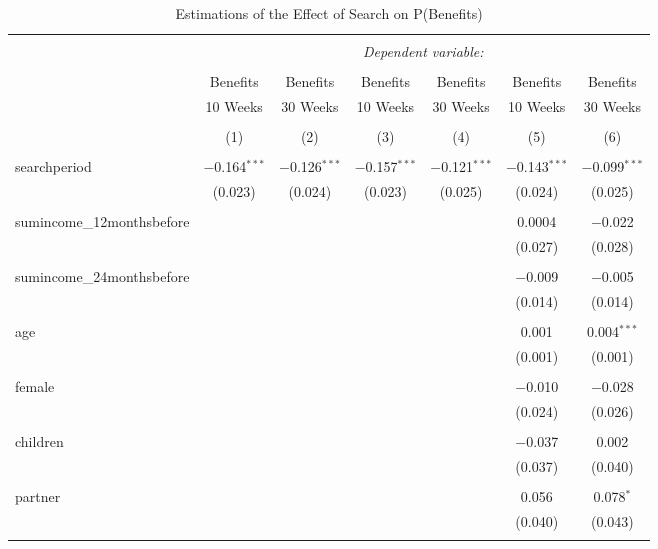 \documentclass[
]{article}
\begin{document}
\begin{table}[!htbp] \centering 
  \caption{Estimations of the Effect of Search on P(Benefits)} 
  \label{tab:reg} 
\begin{tabular}{@{\extracolsep{0pt}}lcccccc} 
\\[-1.8ex]\hline 
\hline \\[-1.8ex] 
 & \multicolumn{6}{c}{\textit{Dependent variable:}} \\ 
\cline{2-7} 
\\[-1.8ex] & Benefits & Benefits & Benefits & Benefits & Benefits & Benefits \\ 
 & 10 Weeks & 30 Weeks & 10 Weeks & 30 Weeks & 10 Weeks & 30 Weeks \\ 
\\[-1.8ex] & (1) & (2) & (3) & (4) & (5) & (6)\\ 
\hline \\[-1.8ex] 
 searchperiod & $-$0.164$^{***}$ & $-$0.126$^{***}$ & $-$0.157$^{***}$ & $-$0.121$^{***}$ & $-$0.143$^{***}$ & $-$0.099$^{***}$ \\ 
  & (0.023) & (0.024) & (0.023) & (0.025) & (0.024) & (0.025) \\ 
  & & & & & & \\ 
 sumincome\_12monthsbefore &  &  &  &  & 0.0004 & $-$0.022 \\ 
  &  &  &  &  & (0.027) & (0.028) \\ 
  & & & & & & \\ 
 sumincome\_24monthsbefore &  &  &  &  & $-$0.009 & $-$0.005 \\ 
  &  &  &  &  & (0.014) & (0.014) \\ 
  & & & & & & \\ 
 age &  &  &  &  & 0.001 & 0.004$^{***}$ \\ 
  &  &  &  &  & (0.001) & (0.001) \\ 
  & & & & & & \\ 
 female &  &  &  &  & $-$0.010 & $-$0.028 \\ 
  &  &  &  &  & (0.024) & (0.026) \\ 
  & & & & & & \\ 
 children &  &  &  &  & $-$0.037 & 0.002 \\ 
  &  &  &  &  & (0.037) & (0.040) \\ 
  & & & & & & \\ 
 partner &  &  &  &  & 0.056 & 0.078$^{*}$ \\ 
  &  &  &  &  & (0.040) & (0.043) \\ 
  & & & & & & \\ 

\end{tabular}
\end{table}
\end{document}
